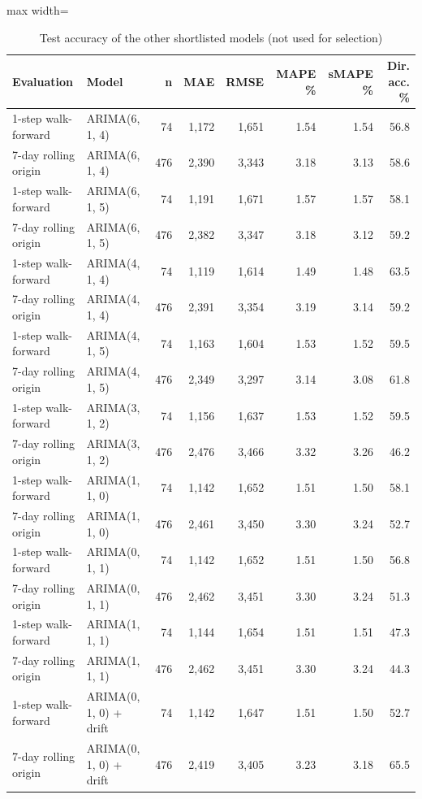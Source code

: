 \documentclass[11pt,a4paper]{article}
\begin{document}
\begin{table}[H]
\centering
\caption{Test accuracy of the other shortlisted models (not used for selection)}
\footnotesize
\setlength{\tabcolsep}{4pt}
\begin{adjustbox}{max width=\linewidth}
\begin{tabular}{llrrrrrr}
\toprule
\textbf{Evaluation} & \textbf{Model} & \textbf{n} & \textbf{MAE} & \textbf{RMSE} & \textbf{MAPE \%} & \textbf{sMAPE \%} & \textbf{Dir. acc. \%} \\
\midrule
1-step walk-forward & ARIMA(6, 1, 4) & 74 & 1,172 & 1,651 & 1.54 & 1.54 & 56.8 \\
7-day rolling origin & ARIMA(6, 1, 4) & 476 & 2,390 & 3,343 & 3.18 & 3.13 & 58.6 \\
1-step walk-forward & ARIMA(6, 1, 5) & 74 & 1,191 & 1,671 & 1.57 & 1.57 & 58.1 \\
7-day rolling origin & ARIMA(6, 1, 5) & 476 & 2,382 & 3,347 & 3.18 & 3.12 & 59.2 \\
1-step walk-forward & ARIMA(4, 1, 4) & 74 & 1,119 & 1,614 & 1.49 & 1.48 & 63.5 \\
7-day rolling origin & ARIMA(4, 1, 4) & 476 & 2,391 & 3,354 & 3.19 & 3.14 & 59.2 \\
1-step walk-forward & ARIMA(4, 1, 5) & 74 & 1,163 & 1,604 & 1.53 & 1.52 & 59.5 \\
7-day rolling origin & ARIMA(4, 1, 5) & 476 & 2,349 & 3,297 & 3.14 & 3.08 & 61.8 \\
1-step walk-forward & ARIMA(3, 1, 2) & 74 & 1,156 & 1,637 & 1.53 & 1.52 & 59.5 \\
7-day rolling origin & ARIMA(3, 1, 2) & 476 & 2,476 & 3,466 & 3.32 & 3.26 & 46.2 \\
1-step walk-forward & ARIMA(1, 1, 0) & 74 & 1,142 & 1,652 & 1.51 & 1.50 & 58.1 \\
7-day rolling origin & ARIMA(1, 1, 0) & 476 & 2,461 & 3,450 & 3.30 & 3.24 & 52.7 \\
1-step walk-forward & ARIMA(0, 1, 1) & 74 & 1,142 & 1,652 & 1.51 & 1.50 & 56.8 \\
7-day rolling origin & ARIMA(0, 1, 1) & 476 & 2,462 & 3,451 & 3.30 & 3.24 & 51.3 \\
1-step walk-forward & ARIMA(1, 1, 1) & 74 & 1,144 & 1,654 & 1.51 & 1.51 & 47.3 \\
7-day rolling origin & ARIMA(1, 1, 1) & 476 & 2,462 & 3,451 & 3.30 & 3.24 & 44.3 \\
1-step walk-forward & ARIMA(0, 1, 0) + drift & 74 & 1,142 & 1,647 & 1.51 & 1.50 & 52.7 \\
7-day rolling origin & ARIMA(0, 1, 0) + drift & 476 & 2,419 & 3,405 & 3.23 & 3.18 & 65.5 \\
\bottomrule
\end{tabular}
\end{adjustbox}
\end{table}
\end{document}
